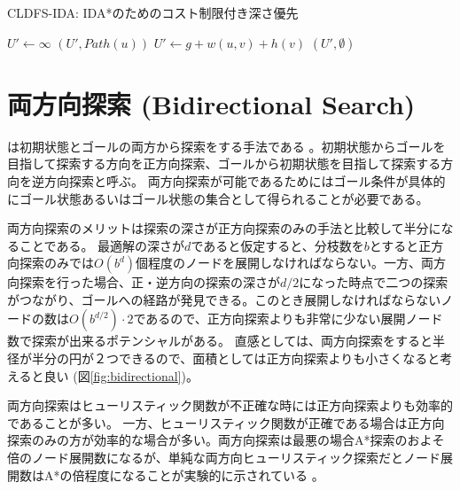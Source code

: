 \begin{algorithm}
\caption{CLDFS-IDA: IDA*のためのコスト制限付き深さ優先}
\label{alg:cldfs-ida}
        $U' \leftarrow \infty$\;
	 {
		\Return $(U', Path(u))$\;
	}
	 {
	   {
             {
              $U' \leftarrow g + w(u, v) + h(v)$\;
            }
     }
	}
	\Return $(U', \emptyset)$\;
\end{algorithm}



\section{両方向探索 (Bidirectional Search)}
\label{sec:bidirectional-search}

は初期状態とゴールの両方から探索をする手法である \cite{pohl1971bi}。初期状態からゴールを目指して探索する方向を正方向探索、ゴールから初期状態を目指して探索する方向を逆方向探索と呼ぶ。
両方向探索が可能であるためにはゴール条件が具体的にゴール状態あるいはゴール状態の集合として得られることが必要である。

両方向探索のメリットは探索の深さが正方向探索のみの手法と比較して半分になることである。
最適解の深さが$d$であると仮定すると、分枝数を$b$とすると正方向探索のみでは$O(b^d)$個程度のノードを展開しなければならない。一方、両方向探索を行った場合、正・逆方向の探索の深さが$d/2$になった時点で二つの探索がつながり、ゴールへの経路が発見できる。このとき展開しなければならないノードの数は$O(b^{d/2}) \cdot 2$であるので、正方向探索よりも非常に少ない展開ノード数で探索が出来るポテンシャルがある。
直感としては、両方向探索をすると半径が半分の円が２つできるので、面積としては正方向探索よりも小さくなると考えると良い (図\ref{fig:bidirectional})。

両方向探索はヒューリスティック関数が不正確な時には正方向探索よりも効率的であることが多い\cite{barker2015limitations}。
一方、ヒューリスティック関数が正確である場合は正方向探索のみの方が効率的な場合が多い。両方向探索は最悪の場合A*探索のおよそ倍のノード展開数になるが、単純な両方向ヒューリスティック探索だとノード展開数はA*の倍程度になることが実験的に示されている \cite{barker2015limitations}。

